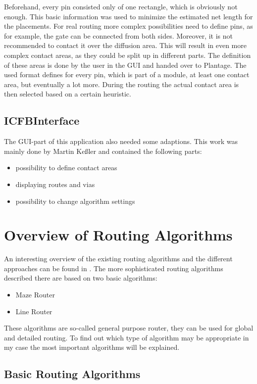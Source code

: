 Beforehand, every pin consisted only of one rectangle, which is obviously not enough. This basic information was used to minimize the estimated net length for the placements. For real routing more complex possibilities need to define pins, as for example, the gate can be connected from both sides. Moreover, it is not recommended to contact it over the diffusion area. This will result in even more complex contact areas, as they could be split up in different parts. The definition of these areas is done by the user in the GUI and handed over to Plantage. The used format defines for every pin, which is part of a module, at least one contact area, but eventually a lot more. During the routing the actual contact area is then selected based on a certain heuristic.

\subsection{ICFBInterface}
The GUI-part of this application also needed some adaptions. This work was mainly done by Martin Keßler and contained the following parts:

\begin{itemize}
\item possibility to define contact areas
\item displaying routes and vias
\item possibility to change algorithm settings
\end{itemize}	

\section{Overview of Routing Algorithms}
An interesting overview of the existing routing algorithms and the different approaches can be found in \cite[page 149 till 201]{springer:eda_analog_routing}. The more sophisticated routing algorithms described there are based on two basic algorithms:
\begin{itemize}
\item Maze Router
\item Line Router
\end{itemize}
These algorithms are so-called general purpose router, they can be used for global and detailed routing. To find out which type of algorithm may be appropriate in my case the most important algorithms will be explained.

\subsection{Basic Routing Algorithms}
